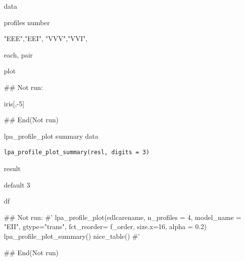 \documentclass[a4paper]{book}
\begin{document}
%
\begin{Arguments}
\begin{ldescription}
\item[\code{data}] data

\item[\code{n\_profiles}] profiles number

\item[\code{model\_name}] "EEE","EEI", "VVV","VVI",

\item[\code{view}] each, pair
\end{ldescription}
\end{Arguments}
%
\begin{Value}
plot
\end{Value}
%
\begin{Examples}
\begin{ExampleCode}

\#\# Not run: 

iris[,-5] %


## End(Not run)


\end{ExampleCode}
\end{Examples}
%
\begin{Description}
lpa\_profile\_plot summary data
\end{Description}
%
\begin{Usage}
\begin{verbatim}
lpa_profile_plot_summary(resl, digits = 3)
\end{verbatim}
\end{Usage}
%
\begin{Arguments}
\begin{ldescription}
\item[\code{resl}] result

\item[\code{digits}] default 3
\end{ldescription}
\end{Arguments}
%
\begin{Value}
df
\end{Value}
%
\begin{Examples}
\begin{ExampleCode}
\#\# Not run: 
#'
lpa_profile_plot(edlcarename, n_profiles = 4, model_name = "EII", gtype="trans",
                 fct_reorder= f_order,
                 size.x=16, alpha = 0.2)%
  lpa_profile_plot_summary() %
  nice_table()
#'

## End(Not run)

\end{ExampleCode}
\end{Examples}
\end{document}
